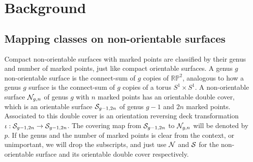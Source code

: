 \section{Background}
\label{sec:background}

\subsection{Mapping classes on non-orientable surfaces}
\label{sec:mapping-classes-non}

Compact non-orientable surfaces with marked points are classified by their genus and number of marked points,
just like compact orientable surfaces. A genus $g$ non-orientable surface is the connect-sum of $g$ copies of
$\mathbb{RP}^2$, analogous to how a genus $g$ surface is the connect-sum of $g$ copies of a torus
$S^1 \times S^1$. A non-orientable surface $\mathcal{N}_{g,n}$ of genus $g$ with $n$ marked points has an orientable
double cover, which is an orientable surface $\mathcal{S}_{g-1, 2n}$ of genus $g-1$ and $2n$ marked points. Associated
to this double cover is an orientation reversing deck transformation $\iota: \mathcal{S}_{g-1, 2n} \to \mathcal{S}_{g-1,
  2n}$. The covering map from $\mathcal{S}_{g-1,2n}$ to $\mathcal{N}_{g,n}$ will be denoted by $p$. If
the genus and the number of marked points is clear from the context, or unimportant, we will drop the
subscripts, and just use $\mathcal{N}$ and $\mathcal{S}$ for the non-orientable surface and its orientable double cover
respectively.

